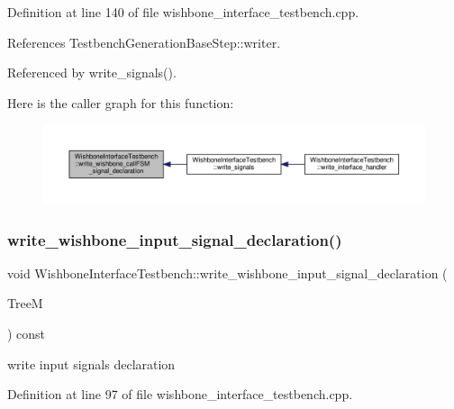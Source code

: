 Definition at line 140 of file wishbone\+\_\+interface\+\_\+testbench.\+cpp.



References Testbench\+Generation\+Base\+Step\+::writer.



Referenced by write\+\_\+signals().

Here is the caller graph for this function\+:
\nopagebreak
\begin{figure}[H]
\begin{center}
\leavevmode
\includegraphics[width=350pt]{de/ded/classWishboneInterfaceTestbench_ac178e39ecf9b0c3a17d65dcb7e07ba60_icgraph}
\end{center}
\end{figure}
\mbox{\label{classWishboneInterfaceTestbench_adc1417a0e4510edbb2235bad38f5741d}} 
\subsubsection{\texorpdfstring{write\+\_\+wishbone\+\_\+input\+\_\+signal\+\_\+declaration()}{write\_wishbone\_input\_signal\_declaration()}}
{\footnotesize\ttfamily void Wishbone\+Interface\+Testbench\+::write\+\_\+wishbone\+\_\+input\+\_\+signal\+\_\+declaration (\begin{DoxyParamCaption}\item[{const \hyperlink{tree__manager_8hpp_a792e3f1f892d7d997a8d8a4a12e39346}{tree\+\_\+manager\+Const\+Ref}}]{TreeM }\end{DoxyParamCaption}) const\hspace{0.3cm}{\ttfamily [protected]}}

write input signals declaration 

Definition at line 97 of file wishbone\+\_\+interface\+\_\+testbench.\+cpp.



